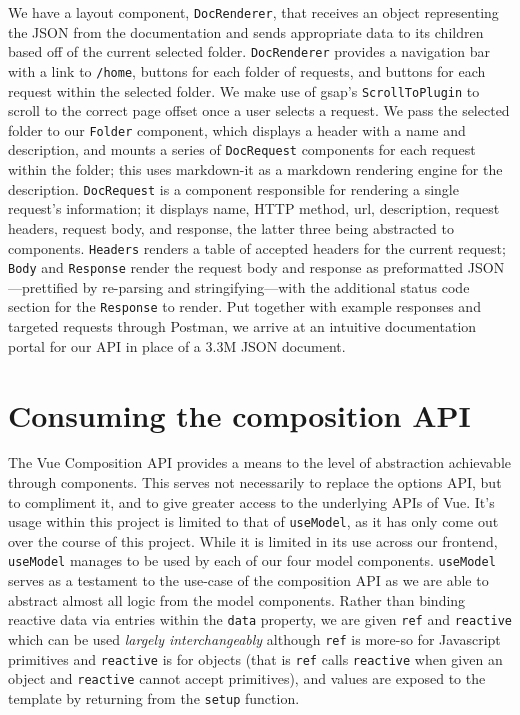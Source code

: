 \documentclass[11pt, twoside, reqno]{book}
\begin{document}
We have a layout component, \texttt{DocRenderer}, that receives an object representing the JSON from the documentation and sends appropriate data to its children based off of the current selected folder. \texttt{DocRenderer} provides a navigation bar with a link to \texttt{/home}, buttons for each folder of requests, and buttons for each request within the selected folder. We make use of gsap's \cite{GSAPGree71:online} \texttt{ScrollToPlugin} to scroll to the correct page offset once a user selects a request. We pass the selected folder to our \texttt{Folder} component, which displays a header with a name and description, and mounts a series of \texttt{DocRequest} components for each request within the folder; this uses markdown-it \cite{markdown14:online} as a markdown rendering engine for the description. \texttt{DocRequest} is a component responsible for rendering a single request's information; it displays name, HTTP method, url, description, request headers, request body, and response, the latter three being abstracted to components. \texttt{Headers} renders a table of accepted headers for the current request; \texttt{Body} and \texttt{Response} render the request body and response as preformatted JSON—prettified by re-parsing and stringifying—with the additional status code section for the \texttt{Response} to render. Put together with example responses and targeted requests through Postman, we arrive at an intuitive documentation portal for our API in place of a 3.3M JSON document.

\section{Consuming the composition API}

The Vue Composition API provides a means to the level of abstraction achievable through components. This serves not necessarily to replace the options API, but to compliment it, and to give greater access to the underlying APIs of Vue. It's usage within this project is limited to that of \texttt{useModel}, as it has only come out over the course of this project. While it is limited in its use across our frontend, \texttt{useModel} manages to be used by each of our four model components. \texttt{useModel} serves as a testament to the use-case of the composition API as we are able to abstract almost all logic from the model components. Rather than binding reactive data via entries within the \texttt{data} property, we are given \texttt{ref} and \texttt{reactive} which can be used \textit{largely interchangeably} although \texttt{ref} is more-so for Javascript primitives and \texttt{reactive} is for objects (that is \texttt{ref} calls \texttt{reactive} when given an object and \texttt{reactive} cannot accept primitives), and values are exposed to the template by returning from the \texttt{setup} function.
\end{document}
